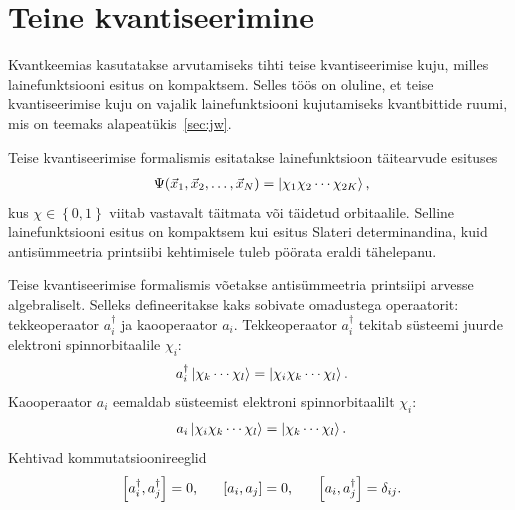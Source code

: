 \documentclass[12pt]{report}
\def\sparen#1{\left[#1\right]}
\def\cparen#1{\left\{#1\right\}}
\def\ket#1{\left|#1\right>}
\begin{document}
\section{Teine kvantiseerimine}\label{sec:secquant}

Kvantkeemias kasutatakse arvutamiseks tihti teise kvantiseerimise kuju, milles lainefunktsiooni esitus on kompaktsem.
Selles töös on oluline, et teise kvantiseerimise kuju on vajalik lainefunktsiooni kujutamiseks kvantbittide ruumi, mis on teemaks alapeatükis~\ref{sec:jw}.

Teise kvantiseerimise formalismis esitatakse lainefunktsioon täitearvude esituses
\begin{align}
    \Psi(\vec{x}_1, \vec{x}_2, \ldots, \vec{x}_N) =
    \ket{\chi_1 \chi_2 \cdots \chi_{2K}} \rlap{,}
\end{align}
kus \(\chi \in \cparen{0, 1}\) viitab vastavalt täitmata või täidetud orbitaalile.
Selline lainefunktsiooni esitus on kompaktsem kui esitus Slateri determinandina, kuid antisümmeetria printsiibi kehtimisele tuleb pöörata eraldi tähelepanu.

Teise kvantiseerimise formalismis võetakse antisümmeetria printsiipi arvesse algebraliselt.
Selleks defineeritakse kaks sobivate omadustega operaatorit: tekkeoperaator \(a_i^\dagger\) ja kaooperaator \(a_i\).
Tekkeoperaator \(a_i^\dagger\) tekitab süsteemi juurde elektroni spinnorbitaalile \(\chi_i\):
\begin{align}
    a_i^\dagger \ket{\chi_k \cdots \chi_l} = \ket{\chi_i \chi_k \cdots \chi_l} \rlap{.}
\end{align}
Kaooperaator \(a_i\) eemaldab süsteemist elektroni spinnorbitaalilt \(\chi_i\):
\begin{align}
    a_i \ket{\chi_i \chi_k \cdots \chi_l} = \ket{\chi_k \cdots \chi_l}\rlap{.}
\end{align}
Kehtivad kommutatsioonireeglid
\begin{align}\label{eq:comrules}
    \sparen{a_i^\dagger, a_j^\dagger} = 0 \rlap{,}
    \qquad \sparen{a_i, a_j} = 0 \rlap{,}
    \qquad \sparen{a_i, a_j^\dagger} = \delta_{ij} \rlap{.}
\end{align}
\end{document}
